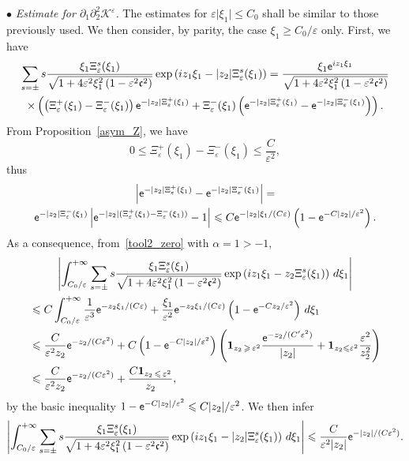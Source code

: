 \documentclass[10pt]{amsart}
\theoremstyle{definition}\newtheorem{defi}[theo]{Definition}\newtheorem{rema}[theo]{Remark}\newtheorem{exam}[theo]{Example}\newtheorem{exem}[theo]{Example}\newtheorem{nota}[theo]{Notation}
\newcommand*\p{\partial}
\newcommand*\BK{\mathcal{K}}
\newcommand{\bfun}{\mathbf{1}}
\newcommand*\ex{{\sf e}}
\newcommand*\cs{{\mathfrak c}}
\newcommand*\ii{\infty}
\newcommand*\gs{\geqslant }
\newcommand*\ls{\leqslant }
\newcommand*\e{\varepsilon}
\renewcommand*\a{\alpha}
\begin{document}
\vspace*{4pt}
\noindent $ \bullet $ \emph{Estimate for $ \p_1 \p_2^2 \BK^\e $.} The estimates for $ \e \lvert \xi_1 \rvert \ls C_0 $ shall be similar to those previously used. We then consider, by parity, the case $ \xi_1 \gs C_0 / \e $ only. First, we have
\begin{multline*}
\sum_{ s = \pm} s \frac{ \xi_1 \Xi_\e^s (\xi_1)}{\sqrt{1 + 4 \e^2 \xi_1^2 \left(1 - \e^2 \cs^2\right)}}
\exp\left(iz_1 \xi_1 - |z_2| \Xi_\e^s (\xi_1) \right)
= \frac{ \xi_1 \ex^{ iz_1 \xi_1}}{\sqrt{1 + 4 \e^2 \xi_1^2\left(1 - \e^2 \cs^2\right)}}
\\ \times
\left(\left(\Xi_\e^+ (\xi_1) - \Xi_\e^- (\xi_1)\right) \ex^{ - |z_2| \Xi_\e^+ (\xi_1)} + \Xi_\e^- (\xi_1) \left(\ex^{ - |z_2| \Xi_\e^+ (\xi_1)} - \ex^{- |z_2| \Xi_\e^- (\xi_1)}\right) \right).
\end{multline*}
From Proposition~\ref{asym_Z}, we have
\begin{equation}\label{conf1}
0 \ls \Xi_\e^+ (\xi_1) - \Xi_\e^- (\xi_1) \ls \frac{C}{\e^2},
\end{equation} thus
\begin{multline}\label{conf2}
\left\lvert \ex^{ - |z_2| \Xi_\e^+ (\xi_1) } - \ex^{ - |z_2| \Xi_\e^- (\xi_1) }\right\rvert  =\\ \ex^{ - |z_2| \Xi_\e^- (\xi_1) } \left\lvert \ex^{ - |z_2| (\Xi_\e^+ (\xi_1) - \Xi_\e^- (\xi_1)) } - 1\right\rvert
\ls C \ex^{ - |z_2| \xi_1/ (C\e) }\left(1 - \ex^{ - C |z_2| /\e^2}\right).
\end{multline}
As a consequence, from~\eqref{tool2_zero} with $ \a = 1 > - 1$,
\begin{multline*}
\left\lvert \int_{ C_0 / \e }^{+\ii}
\sum_{ s = \pm} s \frac{ \xi_1 \Xi_\e^s (\xi_1)}{\sqrt{1 + 4 \e^2 \xi_1^2 \left(1 - \e^2 \cs^2\right) } }
\exp\left(iz_1 \xi_1 - z_2 \Xi_\e^s (\xi_1)\right) \, d \xi_1 \right\rvert\\
\begin{aligned}
& \ls C \int_{ C_0/ \e }^{+\ii} \frac{1}{\e^3} \ex^{ - z_2 \xi_1/ (C\e) } + \frac{\xi_1}{\e^2} \ex^{ - z_2 \xi_1/ (C\e) } \left(1 - \ex^{ - C z_2 /\e^2}\right) \, d \xi_1
\\ &
\ls\frac{C}{\e^2 z_2 } \ex^{ - z_2 / (C\e^2) } + C \left(1 - \ex^{ - C |z_2| /\e^2}\right) \left(\bfun_{ z_2\,\gs\,\e^2} \frac{ \ex^{- z_2 / (C' \e^2)} }{|z_2|} + \bfun_{z_2 \ls \e^2} \frac{\e^2 }{ z_2^2 } \right)
\\ & \ls
\frac{C}{\e^2 z_2 } \ex^{ - z_2 / (C\e^2) } + \frac{ C \bfun_{z_2\,\ls\,\e^2} }{ z_2 },
\end{aligned}
\end{multline*}
by the basic inequality $ 1 - \ex^{ - C |z_2| /\e^2} \ls C |z_2| /\e^2 $. We then infer
\begin{align*}
\left\lvert \int_{C_0/ \e }^{+\ii}
\sum_{ s = \pm} s \frac{ \xi_1 \Xi_\e^s (\xi_1)}{\sqrt{1 + 4 \e^2 \xi_1^2 \left(1 - \e^2 \cs^2\right) } }
\exp\left(iz_1 \xi_1 - |z_2| \Xi_\e^s (\xi_1)\right) \, d \xi_1 \right\rvert
\ls \frac{C}{\e^2 |z_2| } \ex^{ - |z_2| / (C\e^2) }.
\end{align*}
\end{document}
